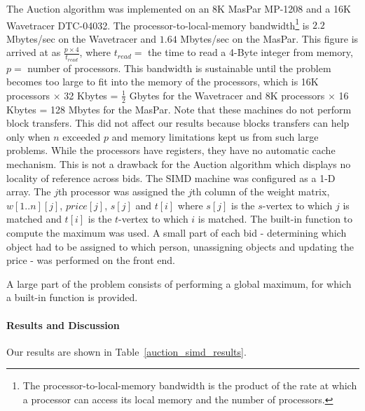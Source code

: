 The Auction algorithm was implemented on an 8K MasPar MP-1208 and
a 16K Wavetracer DTC-04032.
The processor-to-local-memory bandwidth\footnote{
The processor-to-local-memory bandwidth is the product of the rate at
which a processor can access its local memory and the number of processors.
} is $2.2$ Mbytes/sec on the Wavetracer and $1.64$ Mbytes/sec on
the MasPar.
This figure is arrived at as $\frac{p \times 4 }{t_{read}}$, where
$t_{read} = $ the time to read a 4-Byte integer from memory, $p =$
number of processors. 
This bandwidth is sustainable until the problem becomes too 
large to fit into the memory of the processors, which is 
16K processors $\times$ 32 Kbytes = $\frac{1}{2}$ Gbytes for the Wavetracer 
and 8K processors $\times$ 16 Kbytes = 128 Mbytes for the MasPar.
Note that these machines do not perform block transfers.
This did not affect our results because blocks transfers can help
only when $n$ exceeded $p$ and memory limitations kept
us from such large problems.
While the processors have registers, they have no
automatic cache mechanism. This is not a drawback for the Auction
algorithm which displays no locality of reference across bids.
The SIMD machine was configured as a 1-D array. The $j$th processor was 
assigned the $j$th column of the weight matrix, $w[1..n][j]$,
$price[j]$, $s[j]$ and $t[i]$ where $s[j]$ is the $s$-vertex to which
$j$ is matched and $t[i]$ is the $t$-vertex to which $i$ is matched.
The built-in function to compute the maximum was used. A small part
of each bid - determining which object had to be assigned  to which
person, unassigning objects and updating the price - was 
performed on the front end.

A large part of the problem consists of performing a global maximum, 
for which a built-in function is provided.

\paragraph{Results and Discussion}
Our results are shown in Table~\ref{auction_simd_results}.

